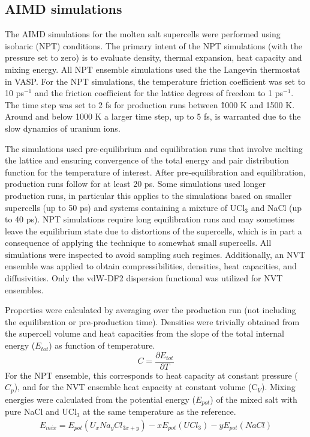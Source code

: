 \documentclass[preprint,3p,10pt,onecolumn,number,sort&compress]{elsarticle}
\begin{document}
\subsection{AIMD simulations}
The AIMD simulations for the molten salt supercells were performed using isobaric (NPT) conditions. The primary intent of the NPT simulations (with the pressure set to zero) is to evaluate density, thermal expansion, heat capacity and mixing energy. All NPT ensemble simulations used the the Langevin thermostat in VASP. For the NPT simulations, the temperature friction coefficient was set to 10 ps$^{-1}$ and the friction coefficient for the lattice degrees of freedom to 1 ps$^{-1}$. The time step was set to 2 fs for production runs between \~1000 K and 1500 K. Around and below 1000 K a larger time step, up to 5 fs, is warranted due to the slow dynamics of uranium ions.

The simulations used pre-equilibrium and equilibration runs that involve melting the lattice and ensuring convergence of the total energy and pair distribution function for the temperature of interest. After pre-equilibration and equilibration, production runs follow for at least 20 ps. Some simulations used longer production runs, in particular this applies to the simulations based on smaller supercells (up to 50 ps) and systems containing a mixture of UCl$_3$ and NaCl (up to 40 ps). NPT simulations require long equilibration runs and may sometimes leave the equilibrium state due to distortions of the supercells, which is in part a consequence of applying the technique to somewhat small supercells. All simulations were inspected to avoid sampling such regimes. Additionally, an NVT ensemble was applied to obtain compressibilities, densities, heat capacities, and diffusivities. Only the vdW-DF2 dispersion functional was utilized for NVT ensembles. 

Properties were calculated by averaging over the production run (not including the equilibration or pre-production time). Densities were trivially obtained from the supercell volume and heat capacities from the slope of the total internal energy ($E_{tot}$) as function of temperature. 
\begin{equation}
\label{eq:cp}
C=\frac{\partial E_{tot}}{\partial T}
\end{equation}
For the NPT ensemble, this corresponds to heat capacity at constant pressure ($C_p$), and for the NVT ensemble heat capacity at constant volume (C$_V$). Mixing energies were calculated from the potential energy ($E_{pot}$) of the mixed salt with pure NaCl and UCl$_3$ at the same temperature as the reference. 
\begin{equation}
\begin{split}
E_{mix}=E_{pot}(U_xNa_yCl_{3x+y})-xE_{pot}(UCl_3)-yE_{pot}(NaCl)
\end{split}
\end{equation}
\end{document}
